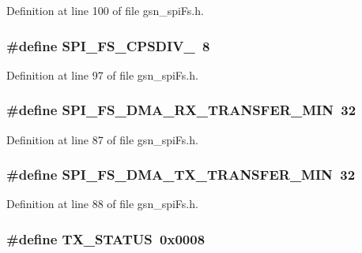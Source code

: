 Definition at line 100 of file gsn\_\-spiFs.h.

\hypertarget{a00589_abb446162a3c6f1ccf7068fd7d309d463}{
\subsubsection[{SPI\_\-FS\_\-CPSDIV\_\-8}]{\setlength{\rightskip}{0pt plus 5cm}\#define SPI\_\-FS\_\-CPSDIV\_~8}}
\label{a00589_abb446162a3c6f1ccf7068fd7d309d463}


Definition at line 97 of file gsn\_\-spiFs.h.

\hypertarget{a00589_a456af18dd9366483ff3b07327d577f26}{
\subsubsection[{SPI\_\-FS\_\-DMA\_\-RX\_\-TRANSFER\_\-MIN}]{\setlength{\rightskip}{0pt plus 5cm}\#define SPI\_\-FS\_\-DMA\_\-RX\_\-TRANSFER\_\-MIN~32}}
\label{a00589_a456af18dd9366483ff3b07327d577f26}


Definition at line 87 of file gsn\_\-spiFs.h.

\hypertarget{a00589_a27d15d7727545ed47bce0008104baf32}{
\subsubsection[{SPI\_\-FS\_\-DMA\_\-TX\_\-TRANSFER\_\-MIN}]{\setlength{\rightskip}{0pt plus 5cm}\#define SPI\_\-FS\_\-DMA\_\-TX\_\-TRANSFER\_\-MIN~32}}
\label{a00589_a27d15d7727545ed47bce0008104baf32}


Definition at line 88 of file gsn\_\-spiFs.h.

\hypertarget{a00589_a7575bf922b1b02fa694d964bb94e1a29}{
\subsubsection[{TX\_\-STATUS}]{\setlength{\rightskip}{0pt plus 5cm}\#define TX\_\-STATUS~0x0008}}
\label{a00589_a7575bf922b1b02fa694d964bb94e1a29}


